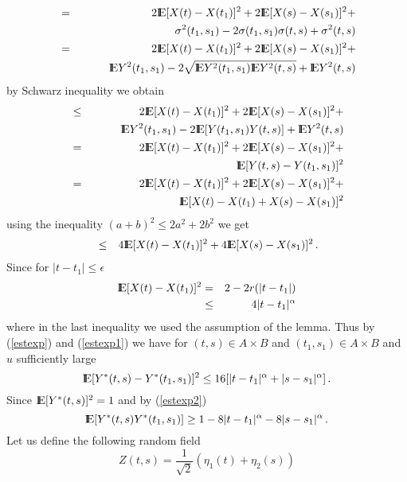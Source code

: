 \begin{eqnarray*}
&=& 2{\rm I\hspace{-0.8mm}E}[X(t)-X(t_1)]^2+2{\rm I\hspace{-0.8mm}E}[X(s)-X(s_1)]^2+\\
&&\,\,\,\,\,\,\,\,\,\,\,\,\,\,\,\sigma^2(t_1,s_1)-2\sigma(t_1,s_1)\sigma(t,s)+
\sigma^2(t,s)\\
&=& 2{\rm I\hspace{-0.8mm}E}[X(t)-X(t_1)]^2+2{\rm I\hspace{-0.8mm}E}[X(s)-X(s_1)]^2+\\
&&\,\,\,\,\,\,\,\,\,\,\,\,\,\,\,{\rm I\hspace{-0.8mm}E} Y^2(t_1,s_1)-2\sqrt{{\rm I\hspace{-0.8mm}E} Y^2(t_1,s_1){\rm I\hspace{-0.8mm}E} Y^2(t,s)}+
{\rm I\hspace{-0.8mm}E} Y^2(t,s)
\end{eqnarray*}
by Schwarz inequality we obtain
\begin{eqnarray*}
&\leq & 2\Exp[X(t)-X(t_1)]^2+2\Exp[X(s)-X(s_1)]^2+\\
&&\,\,\,\,\,\,\,\,\,\,\,\,\,\,\,\Exp Y^2(t_1,s_1)-2\Exp[Y(t_1,s_1)Y(t,s)]+
\Exp Y^2(t,s)\\
&=& 2\Exp[X(t)-X(t_1)]^2+2\Exp[X(s)-X(s_1)]^2+\\
&&\,\,\,\,\,\,\,\,\,\,\,\,\,\,\,\Exp [Y(t,s)-Y(t_1,s_1)]^2\\
&=& 2\Exp[X(t)-X(t_1)]^2+2\Exp[X(s)-X(s_1)]^2+\\
&&\,\,\,\,\,\,\,\,\,\,\,\,\,\,\,\Exp[X(t)-X(t_1)+X(s)-X(s_1)]^2
\end{eqnarray*}
using the inequality $(a+b)^2\leq 2a^2+2b^2$ we get
\begin{eqnarray}
&\leq & 4{\rm I\hspace{-0.8mm}E}[X(t)-X(t_1)]^2+4{\rm I\hspace{-0.8mm}E}[X(s)-X(s_1)]^2\label{estexp}\,.
\end{eqnarray}
Since for $|t-t_1|\leq \epsilon$
\begin{eqnarray}
{\rm I\hspace{-0.8mm}E}[X(t)-X(t_1)]^2&= & 2-2r(|t-t_1|)\nonumber\\
&\leq & 4|t-t_1|^\alpha\label{estexp1}
\end{eqnarray}
where in the last inequality we used the assumption of the lemma. Thus by (\ref{estexp}) and
(\ref{estexp1}) we have for $(t,s)\in A\times B$ and $(t_1,s_1)\in A\times B$ and $u$ sufficiently
large
\begin{equation}\label{estexp2}
{\rm I\hspace{-0.8mm}E}[Y^{*}(t,s)-Y^{*}(t_1,s_1)]^2\leq 
16[|t-t_1|^\alpha+|s-s_1|^\alpha]\,.
\end{equation} 
Since ${\rm I\hspace{-0.8mm}E} [Y^{*}(t,s)]^2=1$ and by (\ref{estexp2})
\begin{equation}\label{covstar}
{\rm I\hspace{-0.8mm}E}[Y^{*}(t,s)Y^{*}(t_1,s_1)]\geq 1-8|t-t_1|^\alpha-8|s-s_1|^\alpha\,.
\end{equation}
Let us define the following random field
\begin{equation}\label{fieldz}
Z(t,s)=\frac{1}{\sqrt{2}}(\eta_1(t)+\eta_2(s))
\end{equation}
